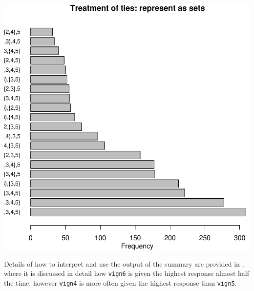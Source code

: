 \documentclass{amsart}
\newcommand{\code}[1]{{\texttt{#1}}}
\begin{document}
\includegraphics{anchors-vignette-order}

Details of how to interpret and use the output of the summary are
provided in \cite{Wand+King+Lau:2011}, where it is discussed in detail how
\code{vign6} is given the highest response almost half the
time, however \code{vign4} is more often given the highest response
than \code{vign5}.  
\end{document}
